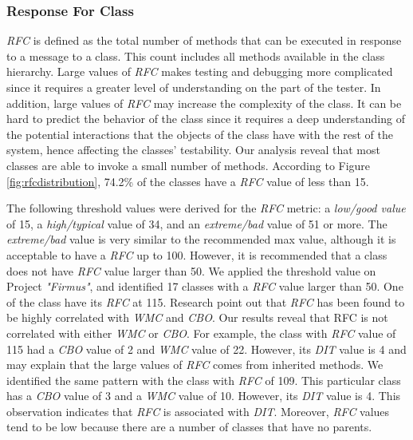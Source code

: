 \subsubsection{Response For Class}
\textit{RFC} is defined as the total number of methods that can be executed in response to a message to a class. This count includes all methods available in the class hierarchy. Large values of \textit{RFC} makes testing and debugging more complicated since it requires a greater level of understanding on the part of the tester\cite{chidamber1994metrics}. In addition, large values of \textit{RFC} may increase the complexity of the class. It can be hard to predict the behavior of the class since it requires a deep understanding of the potential interactions that the objects of the class have with the rest of the system, hence affecting the classes' testability. Our analysis reveal that most classes are able to invoke a small number of methods. According to Figure \ref{fig:rfcdistribution}, 74.2\% of the classes have a \textit{RFC} value of less than 15.

The following threshold values were derived for the \textit{RFC} metric: a \textit{low/good value} of 15, a \textit{high/typical} value of 34, and an \textit{extreme/bad} value of 51 or more. The \textit{extreme/bad} value is very similar to the recommended max value, although it is acceptable to have a \textit{RFC} up to 100\cite{metricoverview}. However, it is recommended that a class does not have \textit{RFC} value larger than 50. We applied the threshold value on Project \textit{"Firmus"}, and identified 17 classes with a \textit{RFC} value larger than 50. One of the class have its \textit{RFC} at 115. Research point out that \textit{RFC} has been found to be highly correlated with \textit{WMC} and \textit{CBO}\cite{chidamber1994metrics}. Our results reveal that RFC is not correlated with either \textit{WMC} or \textit{CBO}. For example, the class with \textit{RFC} value of 115 had a \textit{CBO} value of 2 and \textit{WMC} value of 22. However, its \textit{DIT} value is 4 and may explain that the large values of \textit{RFC} comes from inherited methods. We identified the same pattern with the class with \textit{RFC} of 109. This particular class has a \textit{CBO} value of 3 and a \textit{WMC} value of 10. However, its \textit{DIT} value is 4. This observation indicates that \textit{RFC} is associated with \textit{DIT}. Moreover, \textit{RFC} values tend to be low because there are a number of classes that have no parents.


